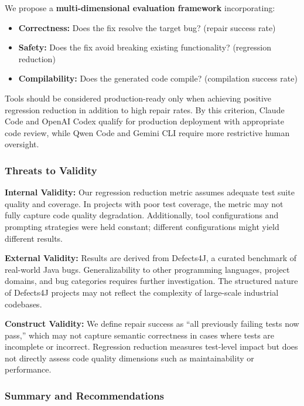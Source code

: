 We propose a \textbf{multi-dimensional evaluation framework} incorporating:

\begin{itemize}[leftmargin=*]
\item \textbf{Correctness:} Does the fix resolve the target bug? (repair success rate)
\item \textbf{Safety:} Does the fix avoid breaking existing functionality? (regression reduction)
\item \textbf{Compilability:} Does the generated code compile? (compilation success rate)
\end{itemize}

Tools should be considered production-ready only when achieving positive regression reduction in addition to high repair rates. By this criterion, Claude Code and OpenAI Codex qualify for production deployment with appropriate code review, while Qwen Code and Gemini CLI require more restrictive human oversight.

\subsubsection{Threats to Validity}

\textbf{Internal Validity:} Our regression reduction metric assumes adequate test suite quality and coverage. In projects with poor test coverage, the metric may not fully capture code quality degradation. Additionally, tool configurations and prompting strategies were held constant; different configurations might yield different results.

\textbf{External Validity:} Results are derived from Defects4J, a curated benchmark of real-world Java bugs. Generalizability to other programming languages, project domains, and bug categories requires further investigation. The structured nature of Defects4J projects may not reflect the complexity of large-scale industrial codebases.

\textbf{Construct Validity:} We define repair success as ``all previously failing tests now pass,'' which may not capture semantic correctness in cases where tests are incomplete or incorrect. Regression reduction measures test-level impact but does not directly assess code quality dimensions such as maintainability or performance.

\subsubsection{Summary and Recommendations}


